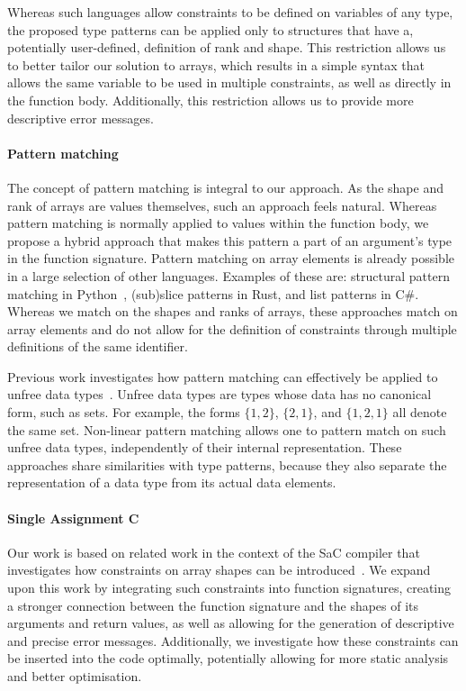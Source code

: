 \documentclass[sigconf,screen]{acmart}
\begin{document}
Whereas such languages allow constraints to be defined on variables of any type, the proposed type patterns can be applied only to structures that have a, potentially user-defined, definition of rank and shape.
This restriction allows us to better tailor our solution to arrays, which results in a simple syntax that allows the same variable to be used in multiple constraints, as well as directly in the function body.
Additionally, this restriction allows us to provide more descriptive error messages.

\paragraph*{Pattern matching}
The concept of pattern matching is integral to our approach.
As the shape and rank of arrays are values themselves, such an approach feels natural.
Whereas pattern matching is normally applied to values within the function body, we propose a hybrid approach that makes this pattern a part of an argument's type in the function signature.
Pattern matching on array elements is already possible in a large selection of other languages.
Examples of these are: structural pattern matching in Python~\cite{pattern-matching-python}, (sub)slice patterns in Rust, and list patterns in C\#.
Whereas we match on the shapes and ranks of arrays, these approaches match on array elements and do not allow for the definition of constraints through multiple definitions of the same identifier.

Previous work investigates how pattern matching can effectively be applied to unfree data types~\cite{active-patterns,non-linear-backtracking,non-linear-scoping}.
Unfree data types are types whose data has no canonical form, such as sets.
For example, the forms $\{ 1, 2 \}$, $\{ 2, 1 \}$, and $\{ 1, 2, 1 \}$ all denote the same set.
Non-linear pattern matching allows one to pattern match on such unfree data types, independently of their internal representation.
These approaches share similarities with type patterns, because they also separate the representation of a data type from its actual data elements.

\paragraph*{Single Assignment C}
Our work is based on related work in the context of the SaC compiler that investigates how constraints on array shapes can be introduced~\cite{sac-contracts,sac-user-constraints,sac-hybrid-types}.
We expand upon this work by integrating such constraints into function signatures, creating a stronger connection between the function signature and the shapes of its arguments and return values, as well as allowing for the generation of descriptive and precise error messages.
Additionally, we investigate how these constraints can be inserted into the code optimally, potentially allowing for more static analysis and better optimisation.
\end{document}
